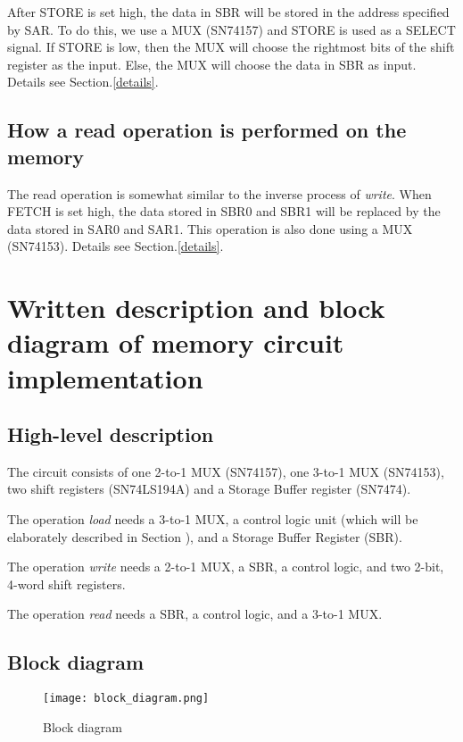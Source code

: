 \documentclass[12pt]{article}
\begin{document}
After STORE is set high, the data in SBR will be stored in the address specified by SAR. To do this, we use a MUX (SN74157) and STORE is used as a SELECT signal. If STORE is low, then the MUX will choose the rightmost bits of the shift register as the input. Else, the MUX will choose the data in SBR as input. Details see Section.\ref{details}.

\subsection{How a read operation is performed on the memory}
The read operation is somewhat similar to the inverse process of \textit{write}. When FETCH is set high, the data stored in SBR0 and SBR1 will be replaced by the data stored in SAR0 and SAR1. This operation is also done using a MUX (SN74153). Details see Section.\ref{details}.

\section{Written description and block diagram of memory circuit implementation}
\subsection{High-level description}
The circuit consists of one 2-to-1 MUX (SN74157), one 3-to-1 MUX (SN74153), two shift registers (SN74LS194A) and a Storage Buffer register (SN7474).

The operation \textit{load} needs a 3-to-1 MUX, a control logic unit (which will be elaborately described in Section ), and a Storage Buffer Register (SBR).

The operation \textit{write} needs a 2-to-1 MUX, a SBR, a control logic, and two 2-bit, 4-word shift registers.

The operation \textit{read} needs a SBR, a control logic, and a 3-to-1 MUX.
\subsection{Block diagram}
\begin{figure}[h]
    \centering
    \texttt{[image: block\_diagram.png]}
    \caption{Block diagram}
    \label{block diagram}
\end{figure}
\end{document}
